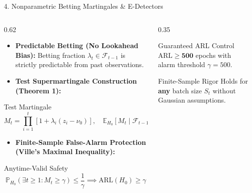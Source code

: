 \documentclass[aspectratio=169, 10pt]{beamer}
\begin{document}
\begin{frame}{4. Nonparametric Betting Martingales \& E-Detectors}
    \begin{columns}[T]
        \begin{column}{0.62\textwidth}
            \begin{itemize}
                \item \textbf{Predictable Betting (No Lookahead Bias):} Betting fraction $\lambda_t \in \mathcal{F}_{t-1}$ is strictly predictable from past observations.
                \item \textbf{Test Supermartingale Construction (Theorem 1):}
            \end{itemize}
            \begin{block}{Test Martingale}
                $$M_t = \prod_{i=1}^t \left[1 + \lambda_i (z_i - \nu_0)\right], \quad \mathbb{E}_{H_0}[M_t \mid \mathcal{F}_{t-1}] \le M_{t-1}$$
            \end{block}
            \begin{itemize}
                \item \textbf{Finite-Sample False-Alarm Protection (Ville's Maximal Inequality):}
            \end{itemize}
            \begin{alertblock}{Anytime-Valid Safety}
                $$\mathbb{P}_{H_0}\left(\exists t \ge 1: M_t \ge \gamma\right) \le \frac{1}{\gamma} \implies \mathrm{ARL}(H_0) \ge \gamma$$
            \end{alertblock}
        \end{column}
        \begin{column}{0.35\textwidth}
            \begin{exampleblock}{Guaranteed ARL Control}
                $\mathrm{ARL} \ge \mathbf{500}$ epochs with alarm threshold $\gamma = 500$.
            \end{exampleblock}
            \vspace{0.3cm}
            \begin{exampleblock}{Finite-Sample Rigor}
                Holds for \textbf{any} batch size $S_t$ without Gaussian assumptions.
            \end{exampleblock}
        \end{column}
    \end{columns}
\end{frame}
\end{document}
